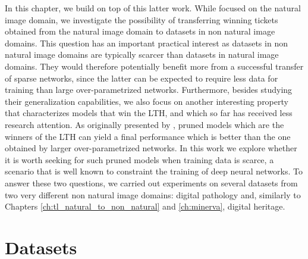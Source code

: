 In this chapter, we build on top of this latter work. While \citet{morcos2019one} focused on the natural image domain, we investigate the possibility of transferring winning tickets obtained from the natural image domain to datasets in non natural image domains. This question has an important practical interest as datasets in non natural image domains are typically scarcer than datasets in natural image domains. They would therefore potentially benefit more from a successful transfer of sparse networks, since the latter can be expected to require less data for training than large over-parametrized networks. Furthermore, besides studying their generalization capabilities, we also focus on another interesting property that characterizes models that win the LTH, and which so far has received less research attention. As originally presented by \citet{frankle2018lottery}, pruned models which are the winners of the LTH can yield a final performance which is better than the one obtained by larger over-parametrized networks. In this work we explore whether it is worth seeking for such pruned models when training data is scarce, a scenario that is well known to constraint the training of deep neural networks. To answer these two questions, we carried out experiments on several datasets from two very different non natural image domains: digital pathology and, similarly to Chapters \ref{ch:tl_natural_to_non_natural} and \ref{ch:minerva}, digital heritage.

\section{Datasets}
\label{sec:datasets}

